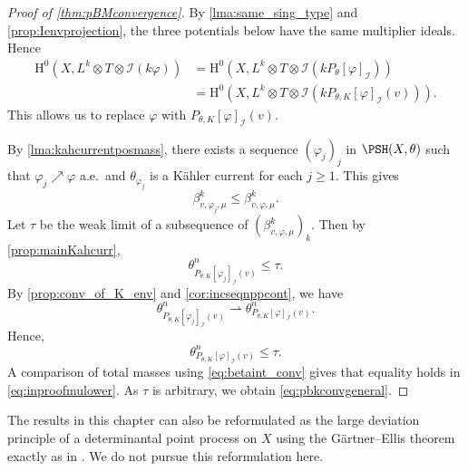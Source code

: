 \begin{proof}[Proof of \cref{thm:pBMconvergence}]
By \cref{lma:same_sing_type} and \cref{prop:Ienvprojection}, the three potentials below have the same multiplier ideals. Hence
\[
\begin{aligned}
\mathrm{H}^0\left(X,L^k \otimes T \otimes \mathcal{I}(k\varphi)\right) &= \mathrm{H}^0\left(X,L^k \otimes T \otimes \mathcal I(kP_{\theta}[\varphi]_{\mathcal{I}})\right)\\
 &= \mathrm{H}^0\left(X,L^k \otimes T \otimes \mathcal I\left(kP_{\theta,K}[\varphi]_{\mathcal{I}}(v)\right)\right).
 \end{aligned}
\]
This allows us to replace $\varphi$ with $P_{\theta,K}[\varphi]_{\mathcal{I}}(v)$.


By \cref{lma:kahcurrentposmass}, there exists a sequence $(\varphi_j)_j$ in $\PSH(X,\theta)$ such that $\varphi_j\nearrow \varphi$ a.e.\ and $\theta_{\varphi_j}$ is a Kähler current for each $j\geq 1$. This gives
\[
\beta^k_{v,\varphi_j,\mu} \leq \beta^k_{v,\varphi,\mu}.
\]
Let $\tau$ be the weak limit of a subsequence of $(\beta^k_{v,\varphi,\mu})_k$. Then by \cref{prop:mainKahcurr},
\[
\theta_{P_{\theta,K} [\varphi_j]_{\mathcal{I}}(v)}^n\leq \tau.
\]
By \cref{prop:conv_of_K_env} and \cref{cor:incseqnppcont}, we have
\[
\theta_{P_{\theta,K} [\varphi_j]_{\mathcal{I}}(v)}^n \rightharpoonup \theta_{P_{\theta,K} [\varphi]_{\mathcal{I}}(v)}^n.
\]
Hence,
\begin{equation}\label{eq:inproofmulower}
\theta_{P_{\theta,K} [\varphi]_{\mathcal{I}}(v)}^n\leq \tau.
\end{equation}
A comparison of total masses using \eqref{eq:betaint_conv} gives that equality holds in \eqref{eq:inproofmulower}. As $\tau$ is arbitrary, we obtain \eqref{eq:pbkconvgeneral}.
\end{proof}

\begin{remark}\label{rmk:Bergman:L1290}
    The results in this chapter can also be reformulated as the large deviation principle of a determinantal point process on $X$ using the Gärtner--Ellis theorem exactly as in \cite{Ber14}. We do not pursue this reformulation here.
\end{remark}
